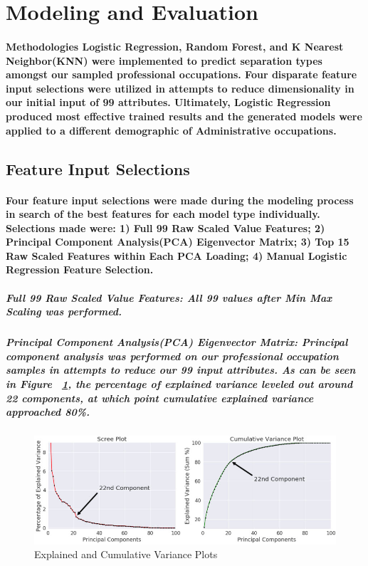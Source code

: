 \documentclass{article}
\begin{document}
\section{Modeling and Evaluation}

\paragraph{Methodologies Logistic Regression, Random Forest, and K Nearest Neighbor(KNN) were implemented to predict separation types amongst our sampled professional occupations. Four disparate feature input selections were utilized in attempts to reduce dimensionality in our initial input of 99 attributes. Ultimately, Logistic Regression produced most effective trained results and the generated models were applied to a different demographic of Administrative occupations.}
 
\subsection{Feature Input Selections}

\paragraph{Four feature input selections were made during the modeling process in search of the best features for each model type individually. Selections made were: 1) Full 99 Raw Scaled Value Features; 2) Principal Component Analysis(PCA) Eigenvector Matrix; 3) Top 15 Raw Scaled Features within Each PCA Loading; 4) Manual Logistic Regression Feature Selection.}

\subparagraph{Full 99 Raw Scaled Value Features: All 99 values after Min Max Scaling was performed.}

\subparagraph{Principal Component Analysis(PCA) Eigenvector Matrix: Principal component analysis was performed on our professional occupation samples in attempts to reduce our 99 input attributes. As can be seen in Figure ~\ref{fig:PCA_Scree_CumVar}, the percentage of explained variance leveled out around 22 components, at which point cumulative explained variance approached 80\%.}

\subparagraph{}
\begin{figure}[H]
\centering
\includegraphics[width=\linewidth]{PCA_Scree_CumVar.jpg}
\caption{Explained and Cumulative Variance Plots}
\label{fig:PCA_Scree_CumVar}
\end{figure}
\end{document}
